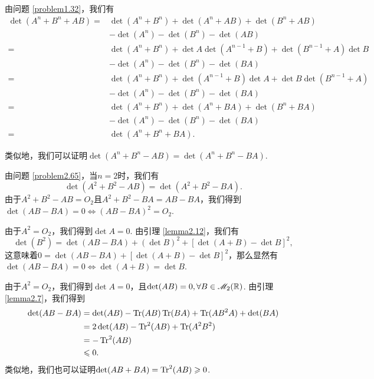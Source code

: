 \begin{solution}
  由问题 \ref{problem1.32}，我们有
  \begin{align*}
    \det(A^n + B^n + AB) = {}& \det (A^n + B^n) + \det(A^n + AB) + \det(B^n + AB) \\
    & -\det(A^n) - \det(B^n) - \det(AB) \\
    = {}& \det(A^n + B^n) + \det A\det(A^{n-1} + B) + \det(B^{n-1} + A)\det B \\
    & - \det(A^n) - \det(B^n) - \det(BA) \\
    = {}& \det(A^n + B^n) + \det(A^{n-1} + B)\det A + \det B\det(B^{n-1} + A) \\
    & - \det(A^n) - \det(B^n) - \det(BA) \\
    = {}& \det (A^n + B^n) + \det(A^n + BA) + \det(B^n + BA) \\
    & - \det(A^n) - \det (B^n) - \det(BA) \\
    = {}& \det(A^n + B^n + BA).
  \end{align*}

  类似地，我们可以证明$\det(A^n+B^n-AB)=\det(A^n+B^n-BA)$.
\end{solution}

\begin{solution}
  由问题 \ref{problem2.65}，当$n=2$时，我们有
  \[
    \det (A^2 + B^2 - AB) = \det(A^2 + B^2 - BA).
  \]
  由于$A^2+B^2-AB=O_2$且$A^2+B^2-BA=AB-BA$，我们得到$\det(AB-BA)=0\Leftrightarrow(AB-BA)^2=O_2$.
\end{solution}

\begin{solution}
  由于$A^2=O_2$，我们得到$\det A=0$. 由引理 \ref{lemma2.12}，我们有
  \[
    \det(B^2) = \det(AB - BA) + (\det B)^2 + [\det(A + B) - \det B]^2,
  \]
  这意味着$0=\det(AB-BA)+[\det(A+B)-\det B]^2$，那么显然有$\det(AB-BA)=0\Leftrightarrow\det(A+B)=\det B$.
\end{solution}

\begin{solution}
  由于$A^2=O_2$，我们得到$\det A=0$，且$\det(AB)=0,\forall B\in\mathscr M_2(\mathbb R)$. 由引理 \ref{lemma2.7}，我们得到
  \begin{align*}
    \det(AB - BA) & = \det (AB) - \operatorname{Tr}(AB)\operatorname{Tr}(BA) + \operatorname{Tr}(AB^2A) + \det (BA) \\
    & = 2\det(AB) - \operatorname{Tr}^2(AB) + \operatorname{Tr}(A^2B^2) \\
    & = -\operatorname{Tr}^2(AB) \\
    & \leqslant 0.
  \end{align*}
  类似地，我们也可以证明$\det(AB+BA)=\operatorname{Tr}^2(AB)\geqslant0$.
\end{solution}

